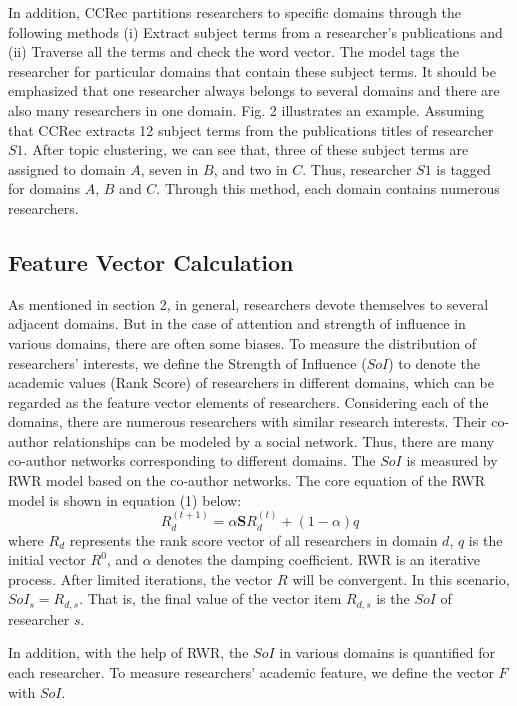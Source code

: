 \documentclass[review]{elsarticle}
\begin{document}
In addition, CCRec partitions researchers to specific domains through the following methods (i) Extract subject terms from a researcher's publications and (ii) Traverse all the terms and check the word vector. The model tags the researcher for particular domains that contain these subject terms. It should be emphasized that one researcher always belongs to several domains and there are also many researchers in one domain. Fig. 2 illustrates an example. Assuming that CCRec extracts 12 subject terms from the publications titles of researcher $S1$. After topic clustering, we can see that, three of these subject terms are assigned to domain $A$, seven in $B$, and two in $C$. Thus, researcher $S1$ is tagged for domains $A$, $B$ and $C$. Through this method, each domain contains numerous researchers.

\subsection{Feature Vector Calculation}
As mentioned in section 2, in general, researchers devote themselves to several adjacent domains. But in the case of attention and strength of influence in various domains, there are often some biases. To measure the distribution of researchers' interests, we define the Strength of Influence ($SoI$) to denote the academic values (Rank Score) of researchers in different domains, which can be regarded as the feature vector elements of researchers. Considering each of the domains, there are numerous researchers with similar research interests. Their co-author relationships can be modeled by a social network. Thus, there are many co-author networks corresponding to different domains. The $SoI$ is measured by RWR model based on the co-author networks. The core equation of the RWR model is shown in equation (1) below:
\begin{equation}
R_{d}^{(t+1)}=\alpha \mathbf{S}R_{d}^{(t)}+(1-\alpha)q
\end{equation}
where $R_{d}$ represents the rank score vector of all researchers in domain $d$, $q$ is the initial vector $R^0$, and $\alpha$ denotes the damping coefficient. RWR is an iterative process. After limited iterations, the vector $R$ will be convergent. In this scenario, $SoI_{s}=R_{d,s}$. That is, the final value of the vector item $R_{d,s}$ is the $SoI$ of researcher $s$.


In addition, with the help of RWR, the $SoI$ in various domains is quantified for each researcher. To measure researchers' academic feature, we define the vector $F$ with $SoI$.
\end{document}
